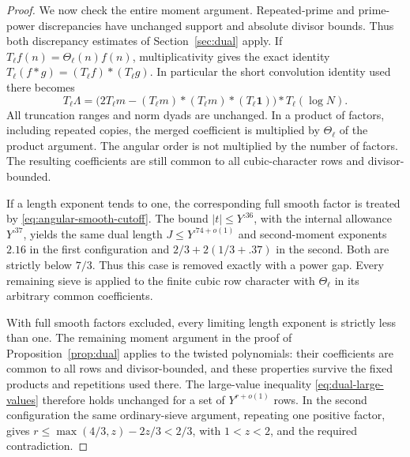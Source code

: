 \begin{proof}
We now check the entire moment argument. Repeated-prime and
prime-power discrepancies have unchanged support and absolute
divisor bounds. Thus both discrepancy estimates of
Section~\ref{sec:dual} apply. If $T_\ell f(n)=\Theta_\ell(n)f(n)$,
multiplicativity gives the exact identity
$T_\ell(f*g)=(T_\ell f)*(T_\ell g)$. In particular the short
convolution identity used there becomes
\[
 T_\ell\Lambda=
 \bigl(2T_\ell m-(T_\ell m)*(T_\ell m)*(T_\ell\mathbf1)\bigr)
       *T_\ell(\log N).
\]
All truncation ranges and norm dyads are unchanged. In a product
of factors, including repeated copies, the merged coefficient is
multiplied by $\Theta_\ell$ of the product argument. The angular
order is not multiplied by the number of factors. The resulting
coefficients are still common to all cubic-character rows and
divisor-bounded.

If a length exponent tends to one, the corresponding full smooth
factor is treated by \eqref{eq:angular-smooth-cutoff}. The bound
$|t|\le Y^{.36}$, with the internal allowance $Y^{.37}$, yields
the same dual length $J\le Y^{.74+o(1)}$ and second-moment
exponents $2.16$ in the first configuration and
$2/3+2(1/3+.37)$ in the second. Both are strictly below $7/3$.
Thus this case is removed exactly with a power gap. Every remaining
sieve is applied to the finite cubic row character with
$\Theta_\ell$ in its arbitrary common coefficients.

With full smooth factors excluded, every limiting length exponent is
strictly less than one. The remaining moment argument in the proof
of Proposition~\ref{prop:dual} applies to the twisted polynomials:
their coefficients are common to all rows and divisor-bounded, and
these properties survive the fixed products and repetitions used
there. The large-value inequality \eqref{eq:dual-large-values}
therefore holds unchanged for a set of $Y^{r+o(1)}$ rows.
In the second configuration the same
ordinary-sieve argument, repeating one positive factor, gives
$r\le\max(4/3,z)-2z/3<2/3$, with $1<z<2$, and the required
contradiction.


\end{proof}
